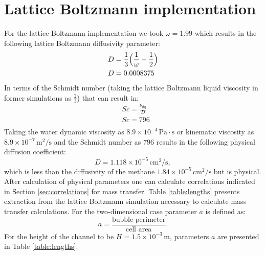\documentclass{article}
\begin{document}
\section{Lattice Boltzmann implementation}
For the lattice Boltzmann implementation we took $\omega=1.99$ which results in the following
lattice Boltzmann diffusivity parameter:
\begin{equation}
\begin{aligned}
&D=\frac{1}{3}\Bigl(\frac{1}{\omega}-\frac{1}{2}\Bigr)\\
&D=0.0008375
\end{aligned}
\end{equation}
In terms of the Schmidt number (taking the lattice Boltzmann liquid viscosity in former simulations
as $\frac{2}{3}$) that
can result in:
\begin{equation}
\begin{aligned}
&Sc=\frac{\nu_{\mathrm{liq}}}{D}\\
&Sc=796\\
\end{aligned}
\end{equation}
Taking the water dynamic viscosity as $8.9 \times 10^{-4}\,\mathrm{Pa\cdot s}$ or kinematic
viscosity as $8.9 \times
10^{-7} \,\mathrm{m^2/s}$ and the Schmidt number as $796$ results in the following physical
diffusion coefficient:
\begin{equation}
D=1.118\times 10^{-5}\,\mathrm{cm^2/s},
\end{equation}
which is less than the diffusivity of the methane $1.84\times 10^{-5}\,\mathrm{cm^2/s}$ but is
physical. After calculation of physical parameters one can calculate correlations indicated in
Section \ref{sec:correlations} for mass transfer. Table \ref{table:lengths} presents extraction
from the lattice Boltzmann simulation necessary to calculate mass transfer calculations.
For the two-dimensional case parameter  $a$ is defined as:
\begin{equation}
a = \frac{\text{bubble perimeter}}{\text{cell area}}.
\end{equation}
For the height of the channel to be $H=1.5 \times 10^{-3}\,\mathrm{m}$, parameters $a$ are
presented in Table \ref{table:lengths}. 
\end{document}
